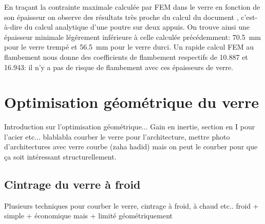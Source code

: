 \documentclass[11pt,titlepage]{article}
\begin{document}
En traçant la contrainte maximale calculée par \acrshort{FEM} dans le verre en fonction de son épaisseur on observe des résultats très proche du calcul du document \cite{fdp78}, c'est-à-dire du calcul analytique d'une poutre sur deux appuis. On trouve ainsi une épaisseur minimale légérement inférieure à celle calculée précédemment: \qty{70.5}{\milli\meter} pour le verre trempé et \qty{56.5}{\milli\meter} pour le verre durci. Un rapide calcul \acrshort{FEM} au flambement nous donne des coefficients de flambement respectifs de 10.887 et 16.943: il n'y a pas de risque de flambement avec ces épaisseurs de verre. 
\newpage

\section{Optimisation géométrique du verre}

Introduction sur l'optimisation géométrique... Gain en inertie, section en I pour l'acier etc...
blablabla courber le verre pour l'architecture, mettre photo d'architectures avec verre courbe (zaha hadid)
mais on peut le courber pour que ça soit intéressant structurellement.

\subsection{Cintrage du verre à froid}

Plusieurs techniques pour courber le verre, cintrage à froid, à chaud etc.. froid + simple + économique mais + limité géométriquement
\end{document}
